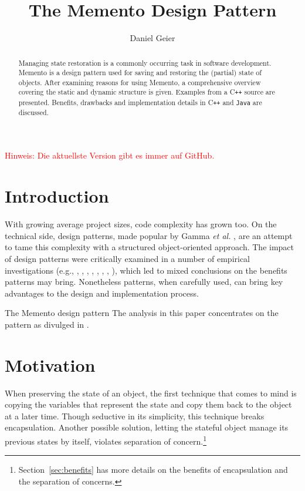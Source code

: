 \documentclass[11pt, a4paper, twoside]{article}
\title{The Memento Design Pattern}
\author{Daniel Geier}
\date{} %
\def\cpp{C{}\texttt{++}}
\begin{document}
	\maketitle
	
	\begin{framed}
		\textcolor{red}{Hinweis: Die aktuellste Version gibt es immer auf GitHub.\footnotemark}
	\end{framed}

	\begin{abstract} \noindent
 		Managing state restoration is a commonly occurring task in software development. Memento is a design pattern used for saving and restoring the (partial) state of objects. After examining reasons for using Memento, a comprehensive overview covering the static and dynamic structure is given. Examples from a \cpp{} source are presented. Benefits, drawbacks and implementation details in \cpp{} and \verb|Java| are discussed.
	\end{abstract}
	
	\section{Introduction}
	\label{sec:intro}
	With growing average project sizes, code complexity has grown too. On the technical side, design patterns, made popular by Gamma \textit{et al.} \cite{gamma1993design}, are an attempt to tame this complexity with a structured object-oriented approach. The impact of design patterns were critically examined in a number of empirical investigations (e.g., \cite{bieman2003design}, \cite{porras2010empirical}, \cite{jeanmart2009impact}, \cite{khomh2008design}, \cite{di2008empirical}, \cite{prechelt2001controlled}, \cite{vokac2004defect}, \cite{vokavc2004controlled}), which led to mixed conclusions on the benefits patterns may bring. Nonetheless patterns, when carefully used, can bring key advantages to the design and implementation process.
	
	The Memento design pattern The analysis in this paper concentrates on the pattern as divulged in \cite{gamma1994design}.
	
	\section{Motivation}
	\label{sec:motivation}
	 When preserving the state of an object, the first technique that comes to mind is copying the variables that represent the state and copy them back to the object at a later time. Though seductive in its simplicity, this technique breaks encapsulation. Another possible solution, letting the stateful object manage its previous states by itself, violates separation of concern.\footnote{Section~\ref{sec:benefits} has more details on the benefits of encapsulation and the separation of concerns.}
	 
\end{document}
